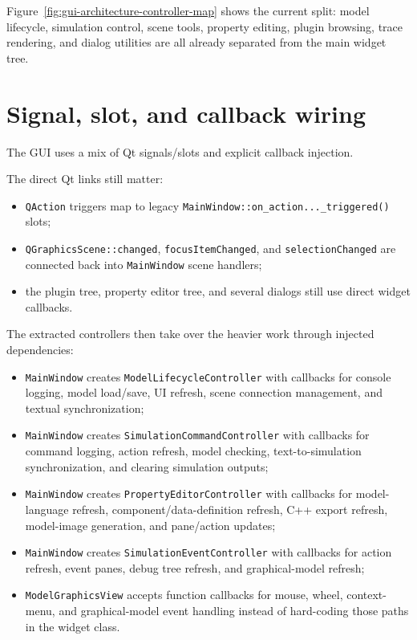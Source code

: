 Figure~\ref{fig:gui-architecture-controller-map} shows the current split: model lifecycle, simulation control, scene tools, property editing, plugin browsing, trace rendering, and dialog utilities are all already separated from the main widget tree.

\section{Signal, slot, and callback wiring}
\label{sec:gui-architecture-signals}

The GUI uses a mix of Qt signals/slots and explicit callback injection.

The direct Qt links still matter:
\begin{itemize}
\item \texttt{QAction} triggers map to legacy \texttt{MainWindow::on\_action...\_triggered()} slots;
\item \texttt{QGraphicsScene::changed}, \texttt{focusItemChanged}, and \texttt{selectionChanged} are connected back into \texttt{MainWindow} scene handlers;
\item the plugin tree, property editor tree, and several dialogs still use direct widget callbacks.
\end{itemize}

The extracted controllers then take over the heavier work through injected dependencies:
\begin{itemize}
\item \texttt{MainWindow} creates \texttt{ModelLifecycleController} with callbacks for console logging, model load/save, UI refresh, scene connection management, and textual synchronization;
\item \texttt{MainWindow} creates \texttt{SimulationCommandController} with callbacks for command logging, action refresh, model checking, text-to-simulation synchronization, and clearing simulation outputs;
\item \texttt{MainWindow} creates \texttt{PropertyEditorController} with callbacks for model-language refresh, component/data-definition refresh, C++ export refresh, model-image generation, and pane/action updates;
\item \texttt{MainWindow} creates \texttt{SimulationEventController} with callbacks for action refresh, event panes, debug tree refresh, and graphical-model refresh;
\item \texttt{ModelGraphicsView} accepts function callbacks for mouse, wheel, context-menu, and graphical-model event handling instead of hard-coding those paths in the widget class.
\end{itemize}

